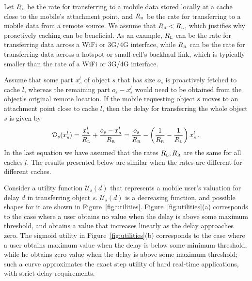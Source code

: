 \documentclass[conference]{IEEEtran}
\newcommand{\Leaf}{\mbox{\tiny L}}
\newcommand{\R}{\mbox{\tiny R}}
\begin{document}
Let $R_{\Leaf}$ be the  rate for transferring to a mobile  data  stored locally at a cache close to the mobile's  attachment point, and $R_{\R}$ be the rate for transferring to a mobile  data from a  remote source. We assume that $R_{\R}<R_{\Leaf}$, which justifies why proactively caching can be beneficial.  As an example, $R_{\Leaf}$ can be the rate for transferring data across a WiFi or 3G/4G interface, while $R_{\R}$ can be the rate for transferring data across a hotspot or small cell's backhaul link, which is typically smaller than the rate of a WiFi or 3G/4G interface.

Assume that some part $x^l_s$ of object $s$ that has size $o_s$ is proactively fetched to  cache  $l$, whereas the remaining part $o_s-x^l_s$ would need to be obtained from the object's original remote location. If  the mobile requesting object $s$ moves to an attachment point close to cache $l$, then the delay for transferring the whole object $s$ is given by
\begin{equation}
\mathcal{D}_s(x^l_s) =  \frac{x^l_s}{R_{\Leaf}} + \frac{o_s-x^l_s}{R_{\R}}  =  \frac{o_s}{R_{\R}} - \left ( \frac{1}{R_{\R}} - \frac{1}{R_{\Leaf}}  \right ) x^l_s  \, .
\label{eq:delay}
\end{equation}
In the last equation we have assumed that the rates $R_{\Leaf}, R_{\R}$ are the same for all caches $l$. The results presented below are similar when the rates are different for different caches.

Consider a utility function $\mathcal{U}_s(d)$ that represents a mobile user's valuation for delay $d$ in transferring object $s$. $\mathcal{U}_s(d)$ is a decreasing function, and possible shapes for it are shown in Figure~\ref{fig:utilities}. Figure~\ref{fig:utilities}(a) corresponds to the case where a user obtains no value when the delay is above some maximum threshold, and obtains  a value that increases linearly as the delay approaches zero.
The sigmoid utility in Figure~\ref{fig:utilities}(b) corresponds to the case where a user obtains maximum value when the delay is below some minimum threshold, while he obtains zero value when the delay is above some maximum threshold; such a curve approximates the exact step utility of hard real-time applications, with strict delay requirements.
\end{document}
